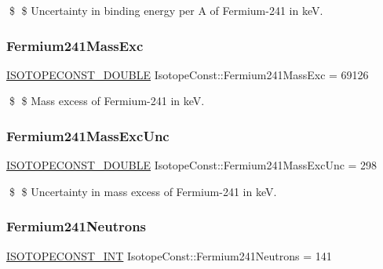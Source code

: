 \$ \$ Uncertainty in binding energy per A of Fermium-\/241 in keV. \mbox{\label{group___isotope_const-_fermium-_fm241_gafaea42d98eb255d552a27d11d9331558}} 
\subsubsection{\texorpdfstring{Fermium241\+Mass\+Exc}{Fermium241MassExc}}
{\footnotesize\ttfamily \mbox{\hyperlink{group___isotope_const-_macros_ga8f45a7272ce02c0b4c65c44636ed719a}{I\+S\+O\+T\+O\+P\+E\+C\+O\+N\+S\+T\+\_\+\+D\+O\+U\+B\+LE}} Isotope\+Const\+::\+Fermium241\+Mass\+Exc = 69126}

\$ \$ Mass excess of Fermium-\/241 in keV. \mbox{\label{group___isotope_const-_fermium-_fm241_ga6789430ccbbd761eaefca33705de8d5c}} 
\subsubsection{\texorpdfstring{Fermium241\+Mass\+Exc\+Unc}{Fermium241MassExcUnc}}
{\footnotesize\ttfamily \mbox{\hyperlink{group___isotope_const-_macros_ga8f45a7272ce02c0b4c65c44636ed719a}{I\+S\+O\+T\+O\+P\+E\+C\+O\+N\+S\+T\+\_\+\+D\+O\+U\+B\+LE}} Isotope\+Const\+::\+Fermium241\+Mass\+Exc\+Unc = 298}

\$ \$ Uncertainty in mass excess of Fermium-\/241 in keV. \mbox{\label{group___isotope_const-_fermium-_fm241_gad8ee965546ac2176e3071946caf61ee4}} 
\subsubsection{\texorpdfstring{Fermium241\+Neutrons}{Fermium241Neutrons}}
{\footnotesize\ttfamily \mbox{\hyperlink{group___isotope_const-_macros_ga5f18360b3e99483a35c32d789e62621c}{I\+S\+O\+T\+O\+P\+E\+C\+O\+N\+S\+T\+\_\+\+I\+NT}} Isotope\+Const\+::\+Fermium241\+Neutrons = 141}

